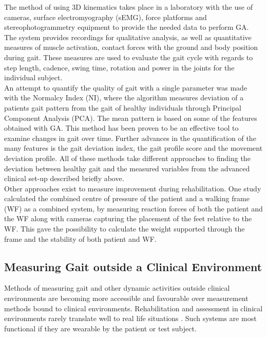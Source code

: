 The method of using 3D kinematics takes place in a laboratory with the use of cameras, surface electromyography (sEMG), force platforms and stereophotogrammetry equipment to provide the needed data to perform GA. The system provides recordings for qualitative analysis, as well as quantitative measures of muscle activation, contact forces with the ground and body position during gait. These measures are used to evaluate the gait cycle with regards to step length, cadence, swing time, rotation and power in the joints for the individual subject. \cite{Sandrini2018}\\
An attempt to quantify the quality of gait with a single parameter was made with the Normalcy Index (NI), where the algorithm measures deviation of a patients gait pattern from the gait of healthy individuals through Principal Component Analysis (PCA). The mean pattern is based on some of the features obtained with GA. This method has been proven to be an effective tool to examine changes in gait over time. \cite{Sandrini2018}
Further advances in the quantification of the many features is the gait deviation index, the gait profile score and the movement deviation profile. All of these methods take different approaches to finding the deviation between healthy gait and the measured variables from the advanced clinical set-up described briefly above. \cite{Sandrini2018}\\
Other approaches exist to measure improvement during rehabilitation. One study calculated the combined centre of pressure of the patient and a walking frame (WF) as a combined system, by measuring reaction forces of both the patient and the WF along with cameras capturing the placement of the feet relative to the WF. This gave the possibility to calculate the weight supported through the frame and the stability of both patient and WF. \cite{Costamagna2017}

\subsection{Measuring Gait outside a Clinical Environment}

Methods of measuring gait and other dynamic activities outside clinical environments are becoming more accessible and favourable over measurement methods bound to clinical environments. Rehabilitation and assessment in clinical environments rarely translate well to real life situations \cite{Basteris2014}. Such systems are most functional if they are wearable by the patient or test subject. 

